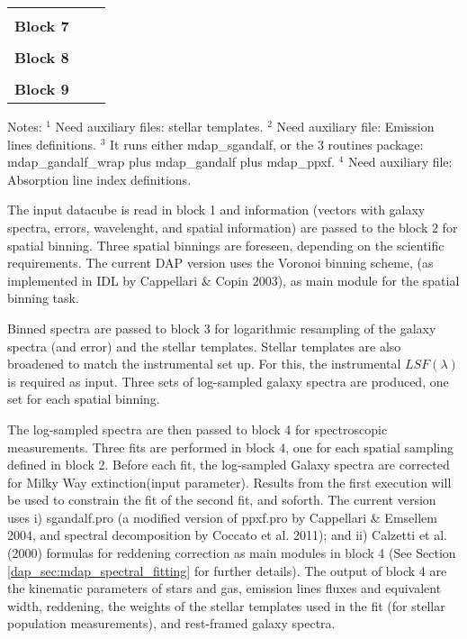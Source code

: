 \documentclass[11pt]{book}
\begin{document}
\begin{table}
\begin{tabular}{l |l |l }
              &                                 &  \\  
\hline
              &                                 &  \\  
{\bf Block 7} &                                 &                                \\
\hline
              &                                 &  \\  
{\bf Block 8} &                                 &                                \\
\hline
              &                                 &  \\  
{\bf Block 9} &                                 &                                \\
\hline
\hline
\end{tabular}
\begin{minipage}{15cm}
Notes: 
$^{1}$ Need auxiliary files: stellar templates. 
$^{2}$ Need auxiliary file: Emission lines definitions. 
$^{3}$ It runs either mdap\_sgandalf, or the 3 routines package: mdap\_gandalf\_wrap plus
mdap\_gandalf plus mdap\_ppxf.
$^{4}$ Need auxiliary file: Absorption line index definitions.
\end{minipage}
\label{dap_tab:modules}
\end{table}

The input datacube is read in block 1 and information (vectors with
galaxy spectra, errors, wavelenght, and spatial information) are
passed to the block 2 for spatial binning. Three spatial binnings are
foreseen, depending on the scientific requirements. The current DAP
version uses the Voronoi binning scheme, (as implemented in IDL by
Cappellari \& Copin 2003), as main module for the spatial binning
task.

Binned spectra are passed to block 3 for logarithmic resampling of the
galaxy spectra (and error) and the stellar templates. Stellar
templates are also broadened to match the instrumental set up. For
this, the instrumental $LSF(\lambda)$ is required as input. Three sets
of log-sampled galaxy spectra are produced, one set for each spatial
binning.

The log-sampled spectra are then passed to block 4 for spectroscopic
measurements. Three fits are performed in block 4, one for each
spatial sampling defined in block 2. Before each fit, the log-sampled
Galaxy spectra are corrected for Milky Way extinction(input
parameter). Results from the first execution will be used to constrain
the fit of the second fit, and soforth. The current version uses i)
sgandalf.pro (a modified version of ppxf.pro by Cappellari \& Emsellem
2004, and spectral decomposition by Coccato et al. 2011); and ii)
Calzetti et al. (2000) formulas for reddening correction as main
modules in block 4 (See Section \ref{dap_sec:mdap_spectral_fitting}
for further details). The output of block 4 are the kinematic
parameters of stars and gas, emission lines fluxes and equivalent
width, reddening, the weights of the stellar templates used in the fit
(for stellar population measurements), and rest-framed galaxy spectra.
\end{document}
